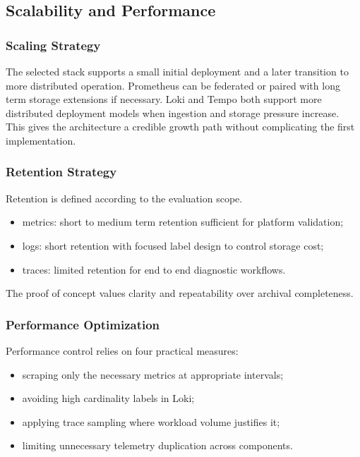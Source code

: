 \subsection{Scalability and Performance}
\label{subsec:scalability}

\subsubsection{Scaling Strategy}
\label{subsubsec:horizontal_scaling}

The selected stack supports a small initial deployment and a later transition to more distributed operation. Prometheus can be federated or paired with long term storage extensions if necessary. Loki and Tempo both support more distributed deployment models when ingestion and storage pressure increase. This gives the architecture a credible growth path without complicating the first implementation.

\subsubsection{Retention Strategy}
\label{subsubsec:data_retention}

Retention is defined according to the evaluation scope.
\begin{itemize}
    \item metrics: short to medium term retention sufficient for platform validation;
    \item logs: short retention with focused label design to control storage cost;
    \item traces: limited retention for end to end diagnostic workflows.
\end{itemize}

The proof of concept values clarity and repeatability over archival completeness.

\subsubsection{Performance Optimization}
\label{subsubsec:performance_optimization}

Performance control relies on four practical measures:
\begin{itemize}
    \item scraping only the necessary metrics at appropriate intervals;
    \item avoiding high cardinality labels in Loki;
    \item applying trace sampling where workload volume justifies it;
    \item limiting unnecessary telemetry duplication across components.
\end{itemize}

